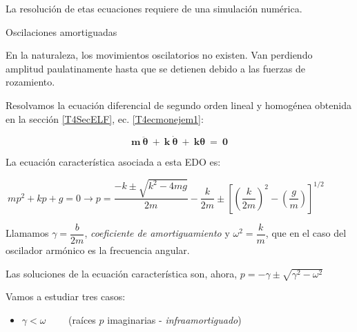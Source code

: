 La resolución de etas ecuaciones requiere de una simulación numérica.


\vspace{1cm}
\begin{center}
\end{center}
\vspace{1cm}




\begin{myexampleblock} {Oscilaciones amortiguadas}

\begin{small}

\vspace{2mm}En la naturaleza, los movimientos oscilatorios no existen. Van perdiendo amplitud paulatinamente hasta que se detienen debido a las fuerzas de rozamiento.

\vspace{2mm}Resolvamos la ecuación diferencial de segundo orden lineal y homogénea obtenida en la sección \ref{T4SecELF}, ec. \ref{T4ecmonejem1}:

 $$\boldsymbol{\ \displaystyle m \ \ddot \theta \ + \ k \ \dot \theta \ + \ k  \theta\ = \ 0 \ }$$


\vspace{2mm} La ecuación característica asociada a esta EDO es: 

\vspace{2mm}
$\ mp^2+kp+g=0 \to p=
\dfrac{-k\pm\sqrt{k^2-4mg}}{2m}
-\dfrac {k}{2m} \pm \left[ \left( \dfrac {k}{2m} \right)^2 - \left( \dfrac g m \right) \right]^{1/2}$

\vspace{2mm} Llamamos $\gamma=\dfrac {b}{2m}$, \emph{coeficiente de amortiguamiento} y $\omega^2=\dfrac{k}{m}$, que en el caso del oscilador armónico es la frecuencia angular.

\vspace{2mm} Las soluciones de la ecuación característica son, ahora, $p=-\gamma \pm \sqrt{\gamma^2-\omega^2}$

\vspace{2mm} Vamos a estudiar tres casos:

\begin{itemize}
\item $\gamma < \omega \qquad$ (raíces $p$ imaginarias - \emph{infraamortiguado})


\end{itemize}
\end{small}
\end{myexampleblock}
